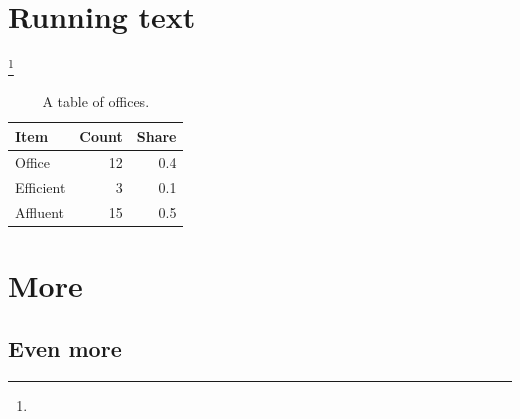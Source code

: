 \documentclass{article}
\begin{document}
\section{Running text}
\lipsum[1-6]\footnote{\lipsum[7]}
\begin{table}[ht]
\centering
\begin{tabular}{lrr}
\toprule
Item & Count & Share \\
\midrule
Office & 12 & 0.4 \\
Efficient & 3 & 0.1 \\
Affluent & 15 & 0.5 \\
\bottomrule
\end{tabular}
\caption{A table of offices.}
\end{table}
\section{More}
\lipsum[8-14]
\subsection{Even more}
\lipsum[15-20]
\end{document}
